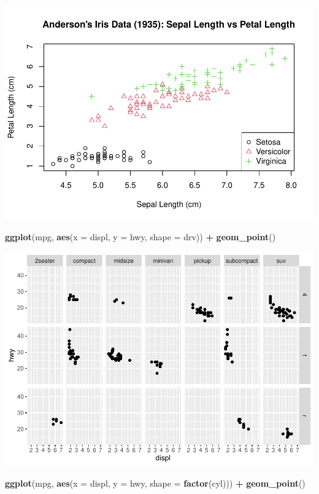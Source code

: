 \documentclass[
]{book}
\newenvironment{Shaded}{\begin{snugshade}}{\end{snugshade}}
\newcommand{\DataTypeTok}[1]{\textcolor[rgb]{0.13,0.29,0.53}{#1}}
\newcommand{\KeywordTok}[1]{\textcolor[rgb]{0.13,0.29,0.53}{\textbf{#1}}}
\newcommand{\NormalTok}[1]{#1}
\newcommand{\OperatorTok}[1]{\textcolor[rgb]{0.81,0.36,0.00}{\textbf{#1}}}
\newcommand{\StringTok}[1]{\textcolor[rgb]{0.31,0.60,0.02}{#1}}
\begin{document}
\includegraphics{_main_files/figure-latex/unnamed-chunk-254-1.pdf}

\begin{Shaded}
\begin{Highlighting}[]
\KeywordTok{ggplot}\NormalTok{(mpg, }\KeywordTok{aes}\NormalTok{(}\DataTypeTok{x =}\NormalTok{ displ, }\DataTypeTok{y =}\NormalTok{ hwy, }\DataTypeTok{shape =}\NormalTok{ drv)) }\OperatorTok{+}\StringTok{ }\KeywordTok{geom_point}\NormalTok{()}
\end{Highlighting}
\end{Shaded}

\includegraphics{_main_files/figure-latex/unnamed-chunk-254-2.pdf}

\begin{Shaded}
\begin{Highlighting}[]
\KeywordTok{ggplot}\NormalTok{(mpg, }\KeywordTok{aes}\NormalTok{(}\DataTypeTok{x =}\NormalTok{ displ, }\DataTypeTok{y =}\NormalTok{ hwy, }\DataTypeTok{shape =} \KeywordTok{factor}\NormalTok{(cyl))) }\OperatorTok{+}\StringTok{ }\KeywordTok{geom_point}\NormalTok{()}
\end{Highlighting}
\end{Shaded}
\end{document}
